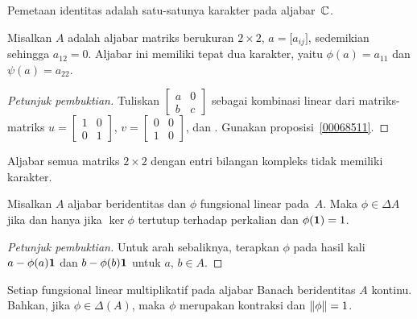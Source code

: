 \begin{exam} Pemetaan identitas adalah satu-satunya karakter pada aljabar~$\mathbb{C}$.
\end{exam}

\begin{exam} Misalkan $A$ adalah aljabar matriks berukuran $2 \times 2$, $a = \bigl[a_{ij}\bigr]$,
sedemikian sehingga $a_{12} = 0$. Aljabar ini memiliki tepat dua karakter, yaitu $\phi(a) = a_{11}$
dan $\psi(a) = a_{22}$.
\end{exam}

\begin{proof}[\emph{Petunjuk pembuktian}] Tuliskan $\begin{bmatrix} a & 0 \\ b & c \end{bmatrix}$ sebagai kombinasi linear
dari matriks-matriks $ u = \begin{bmatrix} 1 & 0 \\ 0 & 1 \end{bmatrix}$, $v = \begin{bmatrix} 0 & 0 \\ 1 & 0 \end{bmatrix}$,
dan . Gunakan proposisi~\ref{00068511}.   \ns
\end{proof}

\begin{exam} Aljabar semua matriks $2 \times 2$ dengan entri bilangan kompleks tidak memiliki karakter.
\end{exam}

\begin{prop} Misalkan $A$ aljabar beridentitas dan $\phi$ fungsional linear pada~$A$. Maka $\phi
\in \Delta A$ jika dan hanya jika $\ker\phi$ tertutup terhadap perkalian dan $\phi(\mathbf{1}) =
1$.
\end{prop}

\begin{proof}[\emph{Petunjuk pembuktian}] Untuk arah sebaliknya, terapkan $\phi$ pada hasil kali
$a - \phi(a)\mathbf{1}$ dan $b - \phi(b)\mathbf{1}$ untuk $a$, $b \in A$. \ns
\end{proof}

\begin{prop}\label{00068522} Setiap fungsional linear multiplikatif pada aljabar Banach beridentitas
$A$ kontinu. Bahkan, jika $\phi \in \Delta(A)$, maka $\phi$ merupakan kontraksi dan
$\lVert\phi\rVert = 1$.
\end{prop}

